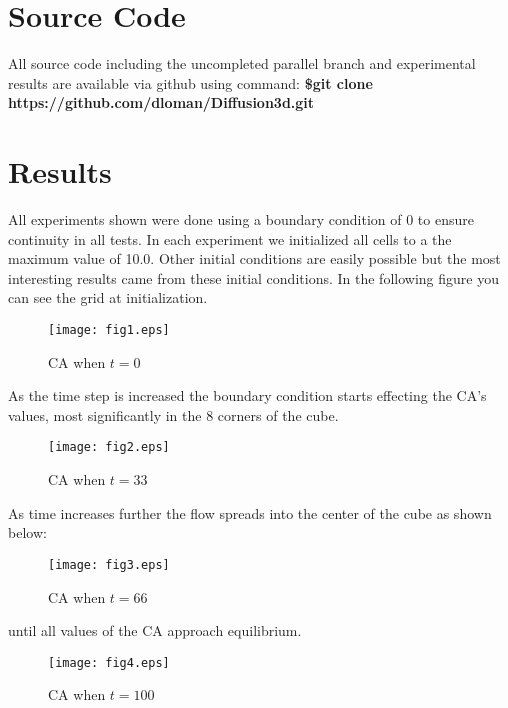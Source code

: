 \documentclass[11pt,twocolumn]{article}
\begin{document}
\section{Source Code}

All source code including the uncompleted parallel branch and experimental results are available 
via github using command: \textbf{\$git clone https://github.com/dloman/Diffusion3d.git}

\section{Results}
All experiments shown were done using a boundary condition of 0 to ensure continuity in all tests. In each experiment we initialized all cells to a the maximum value of 10.0. Other initial conditions are easily possible but the most interesting results came from these initial conditions. In the following figure you can see the grid at initialization.
\begin{figure}[ht!]
\centering
\caption{CA when $t=0$}
\texttt{[image: fig1.eps]}
\end{figure}

\vspace{7mm}

As the time step is increased the boundary condition starts effecting the CA's values, most significantly in the 8 corners of the cube.
 

\begin{figure}[ht!]
\centering
\caption{CA when $t=33$}
\texttt{[image: fig2.eps]}
\end{figure}

\vspace{7mm}

As time increases further the flow spreads into the center of the cube as shown below:

\vspace{5mm}

\begin{figure}[ht!]
\centering
\caption{CA when $t=66$}
\texttt{[image: fig3.eps]}
\end{figure}

\vspace{100mm}

until all values of the CA approach equilibrium.

\begin{figure}[ht!]
\centering
\caption{CA when $t=100$}
\texttt{[image: fig4.eps]}
\end{figure}
\end{document}
